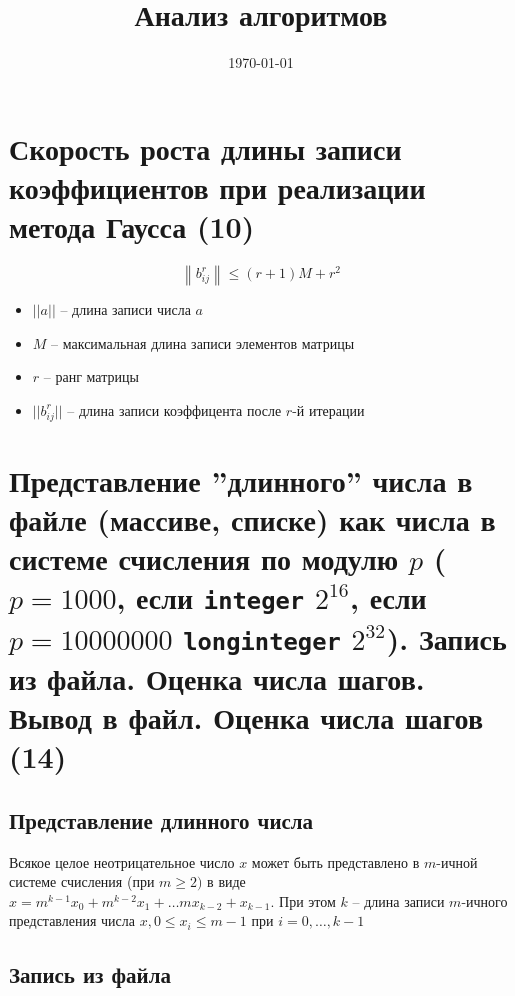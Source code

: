 \documentclass[40pt]{article}
\title{Анализ алгоритмов}
\date{\today}
\begin{document}
\maketitle

\tableofcontents
\newpage







\section{Скорость роста длины записи коэффициентов при реализации метода Гаусса (10)}

$$\left\|b_{i j}^{r}\right\| \leq(r+1) M+r^{2}$$



\begin{itemize}
	\item $||a||$ -- длина записи числа $a$
	\item $M$ -- максимальная длина записи элементов матрицы
	\item $r$ -- ранг матрицы
	\item $||b_{ij}^r||$ -- длина записи коэффицента после $r$-й итерации
\end{itemize}


\section{Представление ''длинного'' числа в файле (массиве, списке) как числа в системе счисления по модулю $p$ ($p=1000$, если \texttt{integer} $2^{16}$, если $p=10 000 000$ \texttt{longinteger} $2^{32}$). Запись из файла. Оценка числа шагов. Вывод в файл. Оценка числа шагов (14)}


\subsection{Представление длинного числа}

Всякое целое неотрицательное число $x$ может быть представлено в $m$-ичной системе счисления (при $m \geq 2)$ в виде $x=m^{k-1} x_{0}+m^{k-2} x_{1}+\ldots m x_{k-2}+x_{k-1}.$ При этом $k$ -- длина записи $m$-ичного представления числа $x, 0 \leq x_{i} \leq m-1$ при $i=0, \ldots, k-1$

\subsection{Запись из файла}
\end{document}
